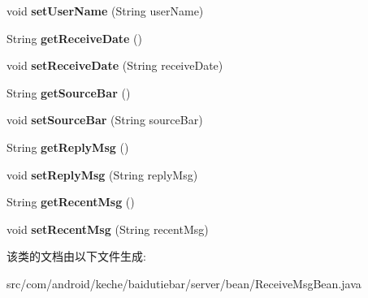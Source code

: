 \begin{DoxyCompactItemize}
void {\bfseries set\+User\+Name} (String user\+Name)
\item 
\mbox{\label{classcom_1_1android_1_1keche_1_1baidutiebar_1_1server_1_1bean_1_1_receive_msg_bean_a7e4e43c6de439fd4d04fa355d84ffe17}} 
String {\bfseries get\+Receive\+Date} ()
\item 
\mbox{\label{classcom_1_1android_1_1keche_1_1baidutiebar_1_1server_1_1bean_1_1_receive_msg_bean_a32c0c8b4f406dc724046321b831cb22c}} 
void {\bfseries set\+Receive\+Date} (String receive\+Date)
\item 
\mbox{\label{classcom_1_1android_1_1keche_1_1baidutiebar_1_1server_1_1bean_1_1_receive_msg_bean_a2ddc6446f190d393ddfefbe8f0b17617}} 
String {\bfseries get\+Source\+Bar} ()
\item 
\mbox{\label{classcom_1_1android_1_1keche_1_1baidutiebar_1_1server_1_1bean_1_1_receive_msg_bean_af40000c6281ec6cc7e78d647524c4440}} 
void {\bfseries set\+Source\+Bar} (String source\+Bar)
\item 
\mbox{\label{classcom_1_1android_1_1keche_1_1baidutiebar_1_1server_1_1bean_1_1_receive_msg_bean_adf148ebb6e5c91517144df3dc7d0934b}} 
String {\bfseries get\+Reply\+Msg} ()
\item 
\mbox{\label{classcom_1_1android_1_1keche_1_1baidutiebar_1_1server_1_1bean_1_1_receive_msg_bean_a05b03b7855c7c3730004cf5efea62505}} 
void {\bfseries set\+Reply\+Msg} (String reply\+Msg)
\item 
\mbox{\label{classcom_1_1android_1_1keche_1_1baidutiebar_1_1server_1_1bean_1_1_receive_msg_bean_a5a65dd052866852493110a418ae56a14}} 
String {\bfseries get\+Recent\+Msg} ()
\item 
\mbox{\label{classcom_1_1android_1_1keche_1_1baidutiebar_1_1server_1_1bean_1_1_receive_msg_bean_a84cfa1ff98501a4adf4528c9a1834267}} 
void {\bfseries set\+Recent\+Msg} (String recent\+Msg)
\end{DoxyCompactItemize}


该类的文档由以下文件生成\+:\begin{DoxyCompactItemize}
\item 
src/com/android/keche/baidutiebar/server/bean/Receive\+Msg\+Bean.\+java\end{DoxyCompactItemize}
